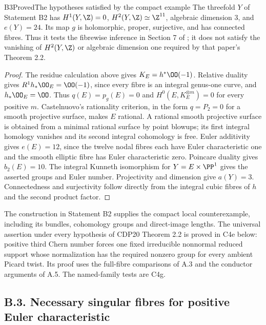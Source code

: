 \begin{statement}{B3}{Proved}{The hypotheses satisfied by the compact example}
The threefold $Y$ of Statement B2 has $H^1(Y,\Z)=0$, $H^2(Y,\Z)\simeq\Z^{11}$, algebraic dimension $3$, and $e(Y)=24$. Its map $g$ is holomorphic, proper, surjective, and has connected fibres. Thus it tests the fibrewise inference in Section 7 of \cite{CDP20}; it does not satisfy the vanishing of $H^2(Y,\Z)$ or algebraic dimension one required by that paper's Theorem 2.2.
\end{statement}
\begin{proof}
The residue calculation above gives $K_E=h^*\OO(-1)$. Relative duality gives $R^1h_*\OO_E=\OO(-1)$, since every fibre is an integral genus-one curve, and $h_*\OO_E=\OO$. Thus $q(E)=p_g(E)=0$ and $H^0(E,K_E^{\otimes m})=0$ for every positive $m$. Castelnuovo's rationality criterion, in the form $q=P_2=0$ for a smooth projective surface, makes $E$ rational. A rational smooth projective surface is obtained from a minimal rational surface by point blowups; its first integral homology vanishes and its second integral cohomology is free. Euler additivity gives $e(E)=12$, since the twelve nodal fibres each have Euler characteristic one and the smooth elliptic fibre has Euler characteristic zero. Poincare duality gives $b_2(E)=10$. The integral Kunneth isomorphism for $Y=E\times\PP^1$ gives the asserted groups and Euler number. Projectivity and dimension give $a(Y)=3$. Connectedness and surjectivity follow directly from the integral cubic fibres of $h$ and the second product factor.
\end{proof}

The construction in Statement B2 supplies the compact local counterexample, including its bundles, cohomology groups and direct-image lengths. The universal assertion under every hypothesis of CDP20 Theorem 2.2 is proved in C4e below: positive third Chern number forces one fixed irreducible nonnormal reduced support whose normalization has the required nonzero group for every ambient Picard twist. Its proof uses the full-fibre comparisons of A.3 and the conductor arguments of A.5. The named-family tests are C4g.


\subsection{B.3. Necessary singular fibres for positive Euler characteristic}


